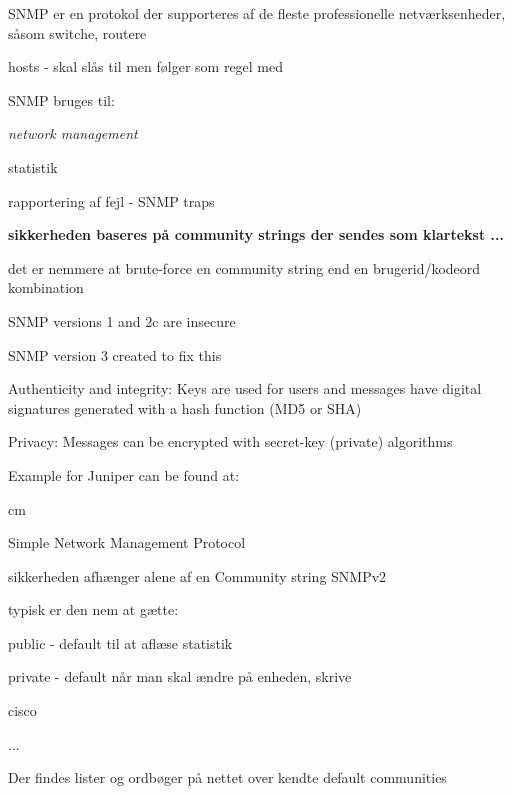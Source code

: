 \documentclass[Screen16to9,17pt]{foils}
\begin{document}

\begin{list1}
\item SNMP er en protokol der supporteres af de fleste professionelle
  netværksenheder, såsom switche, routere
\item hosts - skal slås til men følger som regel med
\item SNMP bruges til:
  \begin{list2}
    \item \emph{network management}
    \item statistik
    \item rapportering af fejl - SNMP traps
  \end{list2}
\item {\bfseries sikkerheden baseres på community strings der sendes
    som klartekst ...}
\item det er nemmere at brute-force en community string end en
  brugerid/kodeord kombination
\end{list1}




\begin{list2}
\item SNMP versions 1 and 2c are insecure
\item SNMP version 3 created to fix this
\item Authenticity and integrity: Keys are used for
users and messages have digital signatures
generated with a hash function (MD5 or SHA)
\item Privacy: Messages can be encrypted with
secret-key (private) algorithms
\end{list2}

Example for Juniper can be found at:\\
{\small{}}


 cm

\begin{list1}
\item Simple Network Management Protocol
\item sikkerheden afhænger alene af en Community string SNMPv2
\item typisk er den nem at gætte:
  \begin{list2}
    \item public - default til at aflæse statistik
\item private - default når man skal ændre på enheden, skrive
\item cisco
\item ...
  \end{list2}
\item Der findes lister og ordbøger på nettet over kendte default communities
\end{list1}
\end{document}
